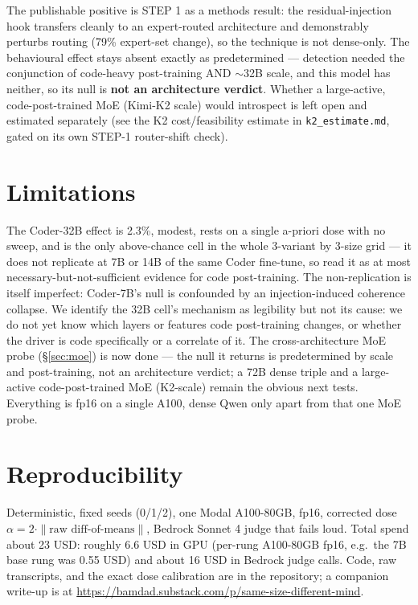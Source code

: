 \documentclass[11pt]{article}
\begin{document}
The publishable positive is STEP 1 as a methods result: the residual-injection hook transfers cleanly to an expert-routed architecture and demonstrably perturbs routing (79\% expert-set change), so the technique is not dense-only. The behavioural effect stays absent exactly as predetermined --- detection needed the conjunction of code-heavy post-training AND $\sim$32B scale, and this model has neither, so its null is \textbf{not an architecture verdict}. Whether a large-active, code-post-trained MoE (Kimi-K2 scale) would introspect is left open and estimated separately (see the K2 cost/feasibility estimate in \texttt{k2\_estimate.md}, gated on its own STEP-1 router-shift check).

\section{Limitations}

The Coder-32B effect is 2.3\%, modest, rests on a single a-priori dose with no sweep, and is the only above-chance cell in the whole 3-variant by 3-size grid --- it does not replicate at 7B or 14B of the same Coder fine-tune, so read it as at most necessary-but-not-sufficient evidence for code post-training. The non-replication is itself imperfect: Coder-7B's null is confounded by an injection-induced coherence collapse. We identify the 32B cell's mechanism as legibility but not its cause: we do not yet know which layers or features code post-training changes, or whether the driver is code specifically or a correlate of it. The cross-architecture MoE probe (\S\ref{sec:moe}) is now done --- the null it returns is predetermined by scale and post-training, not an architecture verdict; a 72B dense triple and a large-active code-post-trained MoE (K2-scale) remain the obvious next tests. Everything is fp16 on a single A100, dense Qwen only apart from that one MoE probe.

\section{Reproducibility}

Deterministic, fixed seeds (0/1/2), one Modal A100-80GB, fp16, corrected dose $\alpha = 2 \cdot \|\text{raw diff-of-means}\|$, Bedrock Sonnet 4 judge that fails loud. Total spend about 23 USD: roughly 6.6 USD in GPU (per-rung A100-80GB fp16, e.g.\ the 7B base rung was 0.55 USD) and about 16 USD in Bedrock judge calls. Code, raw transcripts, and the exact dose calibration are in the repository; a companion write-up is at \url{https://bamdad.substack.com/p/same-size-different-mind}.
\end{document}
